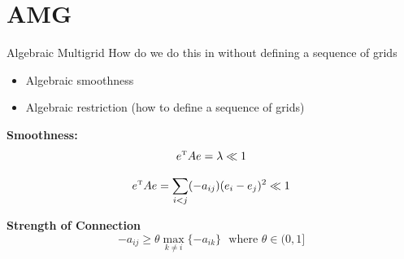 \documentclass[12pt]{beamer}
\begin{document}
\section{AMG}
\begin{frame}{Algebraic Multigrid}
How do we do this in without defining a sequence of grids

\begin{itemize}
  \item Algebraic smoothness
  \item Algebraic restriction (how to define a sequence of grids)
\end{itemize}


\end{frame}





\begin{frame}

\textbf{Smoothness:}
$$e^{\mbox{\tiny{T}}}Ae = \lambda \ll 1$$


$$e^{\mbox{\tiny{T}}}Ae = \sum_{i<j} (-a_{ij})(e_i-e_j)^2 \ll 1$$


\textbf{Strength of Connection}
$$-a_{ij}\geq \theta \max_{k\neq i} \{-a_{ik}\} \ \ \ \mbox{where } \theta \in (0,1]$$


\end{frame}
\end{document}
